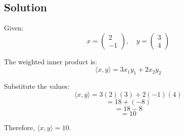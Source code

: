 \subsection*{Solution}

Given:
\[
x = \begin{pmatrix} 2 \\ -1 \end{pmatrix}, \quad y = \begin{pmatrix} 3 \\ 4 \end{pmatrix}
\]

The weighted inner product is:
\[
\langle x, y \rangle = 3x_1y_1 + 2x_2y_2
\]

Substitute the values:
\[
\langle x, y \rangle = 3(2)(3) + 2(-1)(4)
\]
\[
= 18 + (-8)
\]
\[
= 18 - 8
\]
\[
= 10
\]

Therefore, $\langle x, y \rangle = 10$.
